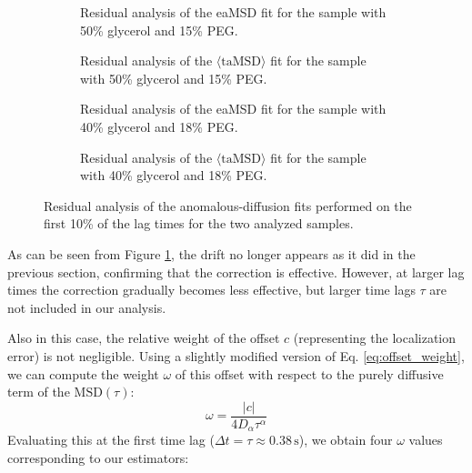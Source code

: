\begin{figure}[!htbp]
    \centering
    \begin{subfigure}[t]{0.45\textwidth}
        \centering
        
        \caption{Residual analysis of the eaMSD fit for the sample with 50\% glycerol and 15\% PEG.}
    \end{subfigure}
    \hfill
    \begin{subfigure}[t]{0.45\textwidth}
        \centering
        
        \caption{Residual analysis of the $\langle \mathrm{taMSD} \rangle$ fit for the sample with 50\% glycerol and 15\% PEG.}
    \end{subfigure}

    \vspace{0.5em}

    \begin{subfigure}[t]{0.45\textwidth}
        \centering
        
        \caption{Residual analysis of the eaMSD fit for the sample with 40\% glycerol and 18\% PEG.}
    \end{subfigure}
    \hfill
    \begin{subfigure}[t]{0.45\textwidth}
        \centering
        
        \caption{Residual analysis of the $\langle \mathrm{taMSD} \rangle$ fit for the sample with 40\% glycerol and 18\% PEG.}
    \end{subfigure}

    \caption{Residual analysis of the anomalous-diffusion fits performed on the first 10\% of the lag times for the two analyzed samples.}
    \label{fig:anomalous_residuals_f010}
\end{figure}
As can be seen from Figure \ref{fig:anomalous_residuals_f010}, the drift no longer appears as it did in the previous section, confirming that the correction is effective. However, at larger lag times the correction gradually becomes less effective, but larger time lags $\tau$ are not included in our analysis.

Also in this case, the relative weight of the offset $c$ (representing the localization error) is not negligible. Using a slightly modified version of Eq. \ref{eq:offset_weight}, we can compute the weight $\omega$ of this offset with respect to the purely diffusive term of the $\mathrm{MSD}(\tau)$:
\begin{equation}\label{eq:offset_weight_anomalous}
    \omega = \frac{|c|}{4D_{\alpha}\tau^{\alpha}}
\end{equation}
Evaluating this at the first time lag ($\Delta t = \tau \approx 0.38\,\mathrm{s}$), we obtain four $\omega$ values corresponding to our estimators:

